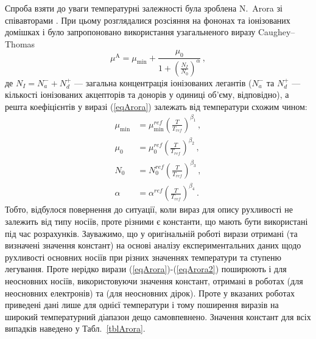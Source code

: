 \documentclass[14pt,a4paper,titlepage,oneside]{book}
\numberwithin{equation}{part}
\begin{document}
Спроба взяти до уваги температурні залежності була зроблена N.~Arora зі співавторами \cite{Arora1982}.
При цьому розглядалися розсіяння на фононах та  іонізованих домішках і було запропоновано використання узагальненого виразу Caughey--Thomas
\begin{equation}\label{eqArora}
  \mu^\mathrm{A}=\mu_\mathrm{min}+\frac{\mu_0}{1+\left(\frac{N_I}{N_0}\right)^\alpha}\,,
\end{equation}
де $N_I=N_a^-+N_d^+$ --- загальна концентрація іонізованих легантів
($N_a^-$ та $N_d^+$ --- кількості іонізованих акцепторів та донорів у одиниці об'єму, відповідно),
а решта коефіцієнтів у виразі (\ref{eqArora}) залежать від температури схожим чином:
\begin{equation}\label{eqArora2}
\begin{aligned}
    \mu_\mathrm{min} &=\mu_\mathrm{min}^{ref}\left(\frac{T}{T_{ref}}\right)^{\beta_1}\,, \\
   \mu_0 &=\mu_0^{ref}\left(\frac{T}{T_{ref}}\right)^{\beta_2}\,,\\
   N_0 &=N_0^{ref}\left(\frac{T}{T_{ref}}\right)^{\beta_3}\,,\\
   \alpha &=\alpha^{ref}\left(\frac{T}{T_{ref}}\right)^{\beta_4}\,.\
\end{aligned}
\end{equation}
Тобто, відбулося повернення до ситуації, коли вираз для опису рухливості не залежить від типу носіїв, проте
різними є константи, що мають бути використані під час розрахунків.
Зауважимо, що у оригінальній роботі \cite{Arora1982} вирази отримані (та визначені значення констант)
на основі аналізу експериментальних даних щодо рухливості основних носіїв при різних значеннях температури та ступеню легування.
Проте нерідко вирази (\ref{eqArora})-(\ref{eqArora2}) поширюють і для неосновних носіїв, використовуючи значення констант,
отримані в роботах \cite{Swirhun1986} (для неосновних електронів) та \cite{Alamo1985} (для неосновних дірок).
Проте у вказаних роботах приведені дані лише для однієї температури і тому поширення виразів на широкий температурний діапазон дещо самовпевнено.
Значення констант для всіх випадків наведено у Табл.~\ref{tblArora}.
\end{document}
